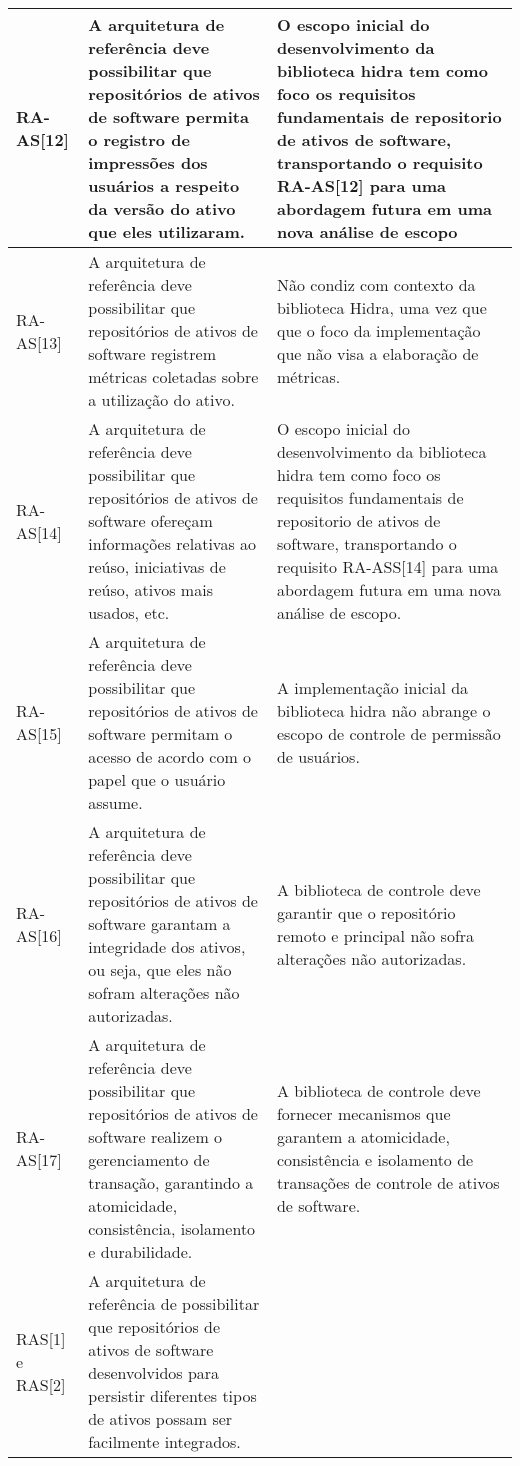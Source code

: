 \begin{longtable}{ | l | p{6cm} | p{6cm} |}
    RA-AS[12] 
    &A arquitetura de referência deve possibilitar que  repositórios de ativos de software permita o registro de  impressões dos usuários a respeito da versão do ativo  que eles utilizaram. 
    & O escopo inicial do desenvolvimento da biblioteca hidra tem como foco os requisitos fundamentais de repositorio de ativos de software, transportando o requisito RA-AS[12] para uma abordagem futura em uma nova análise de escopo \\ \hline
    RA-AS[13] 
    & A arquitetura de referência deve possibilitar que  repositórios de ativos de software registrem métricas  coletadas sobre a utilização do ativo.
    & Não condiz com contexto da biblioteca Hidra, uma vez que que o foco da implementação que não visa
a elaboração de métricas. \\ \hline
    RA-AS[14] 
    & A arquitetura de referência deve possibilitar que  repositórios de ativos de software ofereçam  informações relativas ao reúso, iniciativas de reúso,  ativos mais usados, etc.
    & O escopo inicial do desenvolvimento da biblioteca hidra tem como foco os requisitos fundamentais de repositorio de ativos de software, transportando o requisito RA-ASS[14] para uma abordagem futura em uma nova análise de escopo. \\ \hline
    
    RA-AS[15] 
    & A arquitetura de referência deve possibilitar que  repositórios de ativos de software permitam o acesso de  acordo com o papel que o usuário assume.
    & A implementação inicial da biblioteca hidra não abrange o escopo de controle de permissão de usuários. \\ \hline
    
    RA-AS[16] & A arquitetura de referência deve possibilitar que  repositórios de ativos de software garantam a  integridade dos ativos, ou seja, que eles não sofram  alterações não autorizadas.
    & A biblioteca de controle deve garantir que o repositório remoto e principal não sofra alterações não autorizadas.
 \\ \hline
    RA-AS[17] 
    & A arquitetura de referência deve possibilitar que  repositórios de ativos de software realizem o  gerenciamento de transação, garantindo a atomicidade,  consistência, isolamento e durabilidade.
    & A biblioteca de controle deve fornecer mecanismos que garantem a atomicidade, consistência e isolamento de transações de controle de ativos de software. \\ \hline
     RAS[1] e RAS[2] 
     & A arquitetura de referência de possibilitar que repositórios de  ativos de software desenvolvidos para persistir diferentes tipos  de ativos possam ser facilmente integrados.


\end{longtable}
